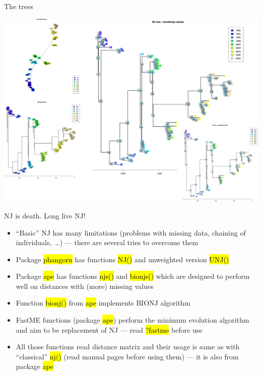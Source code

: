 \documentclass[compress, ucs, xelatex, 11pt, xcolor=svgnames,
  hyperref={
    bookmarks=true,
    unicode=true,
    colorlinks=true,
    pdftitle={Molecular data in R},
    plainpages=false,
    pdfauthor={Vojtech Zeisek},
    pdfsubject={Course about phylogeny and evolution in R},
    pdfcreator={XeLaTeX},
    pdfkeywords={R, evolution, phylogeny, molecular data},
    linkcolor=Tomato,
    anchorcolor=SaddleBrown,
    citecolor=Goldenrod,
    filecolor=DarkMagenta,
    menucolor=Sienna,
    urlcolor=DarkTurquoise,
    pdftex},
  url={hyphens, lowtilde} %
  ]{beamer}
\renewcommand{\texttt}[1]{\hl{\ttfamily #1}}
\begin{document}
\begin{frame}{The trees}
  \begin{center}
    \includegraphics[width=\textwidth-2.5cm]{nj_dna.png}
  \end{center}
\end{frame}

\begin{frame}{NJ is death. Long live NJ!}
  \label{NJ-replacement}
  \begin{itemize}
  \item ``Basic'' NJ has many limitations (problems with missing data, chaining of individuals,~\ldots) --- there are several tries to overcome them
  \item Package \texttt{phangorn} has functions \texttt{NJ()} and unweighted version \texttt{UNJ()}
  \item Package \texttt{ape} has functions \texttt{njs()} and \texttt{bionjs()} which are designed to perform well on distances with (more) missing values
  \item Function \texttt{bionj()} from \texttt{ape} implements BIONJ algorithm
  \item FastME functions (package \texttt{ape}) perform the minimum evolution algorithm and aim to be replacement of NJ --- read \texttt{?fastme} before use
  \item All those functions read distance matrix and their usage is same as with ``classical'' \texttt{nj()} (read manual pages before using them) --- it is also from package \texttt{ape}
  \end{itemize}
\end{frame}
\end{document}
